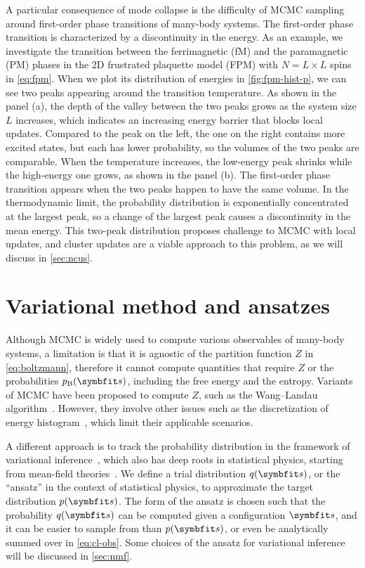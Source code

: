 A particular consequence of mode collapse is the difficulty of MCMC sampling around first-order phase transitions of many-body systems. The first-order phase transition is characterized by a discontinuity in the energy. As an example, we investigate the transition between the ferrimagnetic (fM) and the paramagnetic (PM) phases in the 2D frustrated plaquette model (FPM) with $N = L \times L$ spins in \cref{eq:fpm}. When we plot its distribution of energies in \cref{fig:fpm-hist-p}, we can see two peaks appearing around the transition temperature. As shown in the panel (a), the depth of the valley between the two peaks grows as the system size $L$ increases, which indicates an increasing energy barrier that blocks local updates. Compared to the peak on the left, the one on the right contains more excited states, but each has lower probability, so the volumes of the two peaks are comparable. When the temperature increases, the low-energy peak shrinks while the high-energy one grows, as shown in the panel (b). The first-order phase transition appears when the two peaks happen to have the same volume. In the thermodynamic limit, the probability distribution is exponentially concentrated at the largest peak, so a change of the largest peak causes a discontinuity in the mean energy. This two-peak distribution proposes challenge to MCMC with local updates, and cluster updates are a viable approach to this problem, as we will discuss in \cref{sec:ncus}.

\chapter{Variational method and ansatzes}

Although MCMC is widely used to compute various observables of many-body systems, a limitation is that it is agnostic of the partition function $Z$ in \cref{eq:boltzmann}, therefore it cannot compute quantities that require $Z$ or the probabilities $p_\text{B}(\vs)$, including the free energy and the entropy. Variants of MCMC have been proposed to compute $Z$, such as the Wang--Landau algorithm~\cite{wang2001efficient, landau2021guide5}. However, they involve other issues such as the discretization of energy histogram~\cite{belardinelli2007wang}, which limit their applicable scenarios.

A different approach is to track the probability distribution in the framework of variational inference~\cite{jordan1999introduction, mackay2003information}, which also has deep roots in statistical physics, starting from mean-field theories~\cite{chaikin1995principles4, zdeborova2016statistical}. We define a trial distribution $q(\vs)$, or the ``ansatz'' in the context of statistical physics, to approximate the target distribution $p(\vs)$. The form of the ansatz is chosen such that the probability $q(\vs)$ can be computed given a configuration $\vs$, and it can be easier to sample from than $p(\vs)$, or even be analytically summed over in \cref{eq:cl-obs}. Some choices of the ansatz for variational inference will be discussed in \cref{sec:nmf}.

